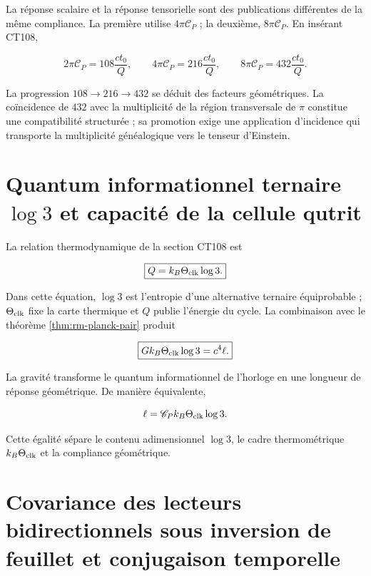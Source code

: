 La réponse scalaire et la réponse tensorielle sont des publications différentes
de la même compliance. La première utilise \(4\pi\mathscr C_P\) ; la deuxième,
\(8\pi\mathscr C_P\). En insérant CT108,

\[
2\pi\mathscr C_P=108\frac{ct_0}{Q},
\qquad
4\pi\mathscr C_P=216\frac{ct_0}{Q},
\qquad
8\pi\mathscr C_P=432\frac{ct_0}{Q}.
\]

La progression \(108\to216\to432\) se déduit des facteurs géométriques.
La coïncidence de \(432\) avec la multiplicité de la région transversale
de \(\pi\) constitue une compatibilité structurée ; sa promotion exige
une application d'incidence qui transporte la multiplicité généalogique vers le tenseur
d'Einstein.

\section{Quantum informationnel ternaire \(\log 3\) et capacité de la cellule qutrit}

La relation thermodynamique de la section CT108 est

\begin{equation}
\boxed{Q=k_B\Theta_{\rm clk}\log3.}
\label{eq:rm-planck-trit}
\end{equation}

Dans cette équation, \(\log3\) est l'entropie d'une alternative ternaire
équiprobable ; \(\Theta_{\rm clk}\) fixe la carte thermique et \(Q\) publie
l'énergie du cycle. La combinaison avec le théorème
\ref{thm:rm-planck-pair} produit

\begin{equation}
\boxed{
Gk_B\Theta_{\rm clk}\log3=c^4\ell.}
\label{eq:rm-gravity-information}
\end{equation}

La gravité transforme le quantum informationnel de l'horloge en une longueur de
réponse géométrique. De manière équivalente,

\[
\ell=\mathscr C_P k_B\Theta_{\rm clk}\log3.
\]

Cette égalité sépare le contenu adimensionnel \(\log3\), le cadre
thermométrique \(k_B\Theta_{\rm clk}\) et la compliance géométrique.

\section{Covariance des lecteurs bidirectionnels sous inversion de feuillet et conjugaison temporelle}

